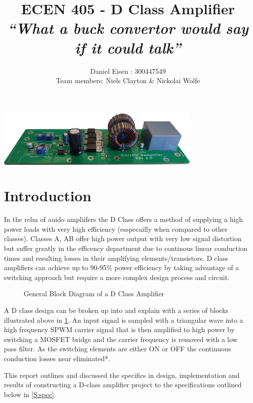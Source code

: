 \documentclass[11pt]{article}
\title{ECEN 405 -  D Class Amplifier \\ \large{\textit{``What a buck convertor would say if it could talk''}} }
\author{Daniel Eisen : 300447549 \\Team members: Niels Clayton \& Nickolai Wolfe}
\date{}
\begin{document}
\maketitle
\begin{center}
  \vspace*{-8mm}
  \includegraphics[width=0.75\textwidth]{img/real.png}
\end{center}{

\section{Introduction}

In the relm of auido ampliifers the D Class offers a method of supplying a high power loads with very high efficiency (esspecailly when compared to other classes). Classes A, AB offer high power output with very low signal distortion but suffer greatly in the efficency department due to continous linear conduction times and resulting losses in their amplifying elements/transistors. D class amplifiers can achieve up to 90-95\% power efficiency by taking advantage of a switching approach but require a more complex design process and circuit.

\begin{figure}[h!]
  \centering
  \caption{General Block Diagram of a D Class Amplifier}
  \label{F:block}
\end{figure}
A D class design can be broken up into and explain with a series of blocks illustrated above in \cref{F:block}. An input signal is sampled with a triangular wave into a high frequency SPWM carrier signal that is then amplified to high power by switching a MOSFET bridge and the carrier frequency is removed with a low pass filter. As the switching elements are either ON or OFF the continuous conduction losses near eliminated*.

This report outlines and discussed the specifics in design, implementation and results of constructing a D-class amplifier project to the specifications outlined below in \cref{S:spec}.

}
\end{document}
